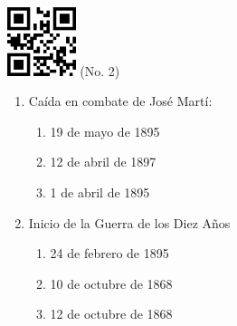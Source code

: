 \documentclass[twocolumn]{article}
\title{}
\date{}
\begin{document}

\begin{center}
 \hspace{0.2cm}
 \includegraphics[width=2cm]{qrcode-2.png}
 \hspace{0.5cm}
 \Large{  (No. 2) }
\end{center}



\begin{enumerate}



  \item Caída en combate de José Martí:

  \begin{enumerate}
   
   \item 19 de mayo de 1895
   
   \item 12 de abril de 1897
   
   \item 1 de abril de 1895
   
  \end{enumerate}



  \item Inicio de la Guerra de los Diez Años

  \begin{enumerate}
   
   \item 24 de febrero de 1895
   
   \item 10 de octubre de 1868
   
   \item 12 de octubre de 1868
   
  \end{enumerate}


\end{enumerate}


\end{document}
